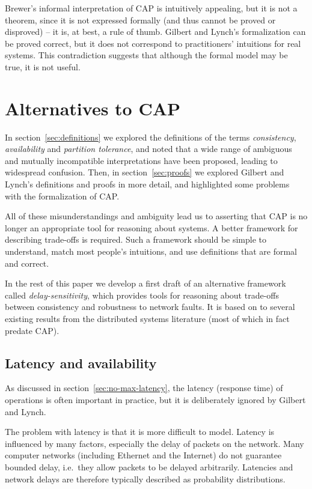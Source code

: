 \documentclass[a4paper,twocolumn,10pt]{article}
\begin{document}
Brewer's informal interpretation of CAP is intuitively appealing, but it is not a theorem, since it
is not expressed formally (and thus cannot be proved or disproved) -- it is, at best, a rule of
thumb. Gilbert and Lynch's formalization can be proved correct, but it does not correspond to
practitioners' intuitions for real systems. This contradiction suggests that although the formal
model may be true, it is not useful.

\section{Alternatives to CAP}\label{sec:alternatives}

In section~\ref{sec:definitions} we explored the definitions of the terms \emph{consistency},
\emph{availability} and \emph{partition tolerance}, and noted that a wide range of ambiguous and
mutually incompatible interpretations have been proposed, leading to widespread confusion. Then,
in section~\ref{sec:proofs} we explored Gilbert and Lynch's definitions and proofs in more detail,
and highlighted some problems with the formalization of CAP.

All of these misunderstandings and ambiguity lead us to asserting that CAP is no longer an
appropriate tool for reasoning about systems. A better framework for describing trade-offs is
required. Such a framework should be simple to understand, match most people's intuitions, and use
definitions that are formal and correct.

In the rest of this paper we develop a first draft of an alternative framework called
\emph{delay-sensitivity}, which provides tools for reasoning about trade-offs between consistency
and robustness to network faults. It is based on to several existing results from the distributed
systems literature (most of which in fact predate CAP).

\subsection{Latency and availability}\label{sec:latency-availability}

As discussed in section~\ref{sec:no-max-latency}, the latency (response time) of operations is often
important in practice, but it is deliberately ignored by Gilbert and Lynch.

The problem with latency is that it is more difficult to model. Latency is influenced by many
factors, especially the delay of packets on the network. Many computer networks (including Ethernet
and the Internet) do not guarantee bounded delay, i.e.\ they allow packets to be delayed
arbitrarily. Latencies and network delays are therefore typically described as probability
distributions.
\end{document}
